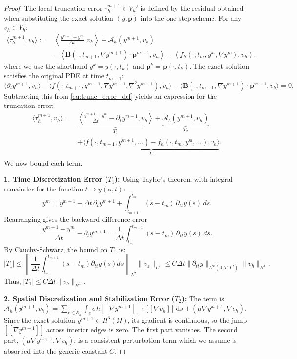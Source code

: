 \documentclass[pdflatex,sn-mathphys-num]{sn-jnl}%
\theoremstyle{thmstyleone}%
\numberwithin{equation}{section}
\begin{document}
\begin{proof}
The local truncation error $\tau_h^{m+1} \in V_h'$ is defined by the residual obtained when substituting the exact solution $(y, \bm{p})$ into the one-step scheme. For any $v_h \in V_h$:
\begin{equation}
\label{eq:trunc_error_def}
\begin{split}
\langle \tau_h^{m+1}, v_h \rangle :=& \left\langle \frac{y^{m+1} - y^m}{\Delta t}, v_h \right\rangle + \mathcal{A}_h(y^{m+1}, v_h) \\
&- \left\langle \bm{B}(\cdot, t_{m+1}, \nabla y^{m+1}) \cdot \bm{p}^{m+1}, v_h \right\rangle - \left\langle f_h(\cdot, t_m, y^m, \nabla y^m), v_h \right\rangle,
\end{split}
\end{equation}
where we use the shorthand $y^k = y(\cdot, t_k)$ and $\bm{p}^k = \bm{p}(\cdot, t_k)$. The exact solution satisfies the original PDE at time $t_{m+1}$:
$$\langle \partial_t y^{m+1}, v_h \rangle - \langle f(\cdot, t_{m+1}, y^{m+1}, \nabla y^{m+1}, \nabla^2 y^{m+1}), v_h \rangle - \langle \bm{B}(\cdot, t_{m+1}, \nabla y^{m+1}) \cdot \bm{p}^{m+1}, v_h \rangle = 0.$$
Subtracting this from \eqref{eq:trunc_error_def} yields an expression for the truncation error:
\begin{align*}
\langle \tau_h^{m+1}, v_h \rangle = &\underbrace{\left\langle \frac{y^{m+1} - y^m}{\Delta t} - \partial_t y^{m+1}, v_h \right\rangle}_{T_1} + \underbrace{\mathcal{A}_h(y^{m+1}, v_h)}_{T_2} \\
&+ \underbrace{\langle f(\cdot, t_{m+1}, y^{m+1}, \dots) - f_h(\cdot, t_m, y^m, \dots), v_h \rangle}_{T_3}.
\end{align*}
We now bound each term.

\textbf{1. Time Discretization Error ($T_1$):}
Using Taylor's theorem with integral remainder for the function $t \mapsto y(\bm{x},t)$:
$$y^m = y^{m+1} - \Delta t \, \partial_t y^{m+1} + \int_{t_{m+1}}^{t_m} (s - t_m) \, \partial_{tt} y(s) \, ds.$$
Rearranging gives the backward difference error:
$$\frac{y^{m+1} - y^m}{\Delta t} - \partial_t y^{m+1} = \frac{1}{\Delta t} \int_{t_m}^{t_{m+1}} (s - t_m) \, \partial_{tt} y(s) \, ds.$$
By Cauchy-Schwarz, the bound on $T_1$ is:
$$|T_1| \leq \left\| \frac{1}{\Delta t} \int_{t_m}^{t_{m+1}} (s-t_m) \partial_{tt}y(s) ds \right\|_{L^2} \|v_h\|_{L^2} \leq C \Delta t \|\partial_{tt}y\|_{L^\infty(0,T; L^2)} \|v_h\|_{H^1}.$$
Thus, $|T_1| \leq C \Delta t \|v_h\|_{H^1}$.

\textbf{2. Spatial Discretization and Stabilization Error ($T_2$):}
The term is $\mathcal{A}_h(y^{m+1}, v_h) = \sum_{e \in \mathcal{E}_h} \int_e \sigma h [\![ \nabla y^{m+1} ]\!] \cdot [\![ \nabla v_h ]\!] \, \mathrm{d}s + (\mu \nabla y^{m+1}, \nabla v_h)$. Since the exact solution $y^{m+1} \in H^3(\Omega)$, its gradient is continuous, so the jump $[\![ \nabla y^{m+1} ]\!]$ across interior edges is zero. The first part vanishes. The second part, $(\mu \nabla y^{m+1}, \nabla v_h)$, is a consistent perturbation term which we assume is absorbed into the generic constant $C$.


\end{proof}
\end{document}
